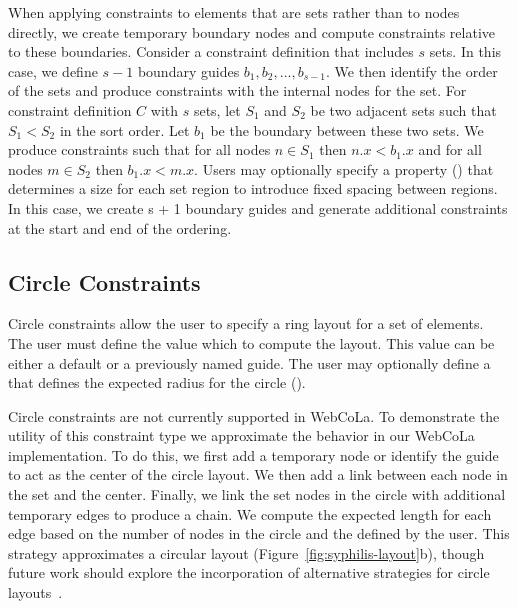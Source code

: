 When applying constraints to elements that are sets rather than to nodes
directly, we create temporary boundary nodes and compute constraints relative to
these boundaries. Consider a constraint definition that includes $s$ sets. 
In this case, we define $s-1$ boundary guides $b_1, b_2, ..., b_{s-1}$. We then
identify the order of the sets and produce constraints with the internal
nodes for the set. For constraint definition $C$ with $s$ sets, let $S_1$ and
$S_2$ be two adjacent sets such that $S_1 < S_2$ in the sort order. Let $b_1$ be
the boundary between these two sets. We produce constraints such that for all
nodes $n \in S_1$ then $n.x < b_1.x$ and for all nodes $m \in S_2$ then $b_1.x < m.x$.
Users may optionally specify a  property ()
that determines a size for each set region to introduce fixed spacing between regions.
In this case, we create s + 1 boundary guides and generate additional 
constraints at the start and end of the ordering.

\vspace{-5px}
\subsection{Circle Constraints}
Circle constraints allow the user to specify a ring layout for a set of
elements. The user must define the value  which to compute 
the layout. This value can be either a default  or a previously 
named guide. The user may optionally define a  that 
defines the expected radius for the circle ().

Circle constraints are not currently supported in WebCoLa. To
demonstrate the utility of this constraint type we approximate the behavior
in our WebCoLa implementation. To do this, we first add a temporary node
or identify the guide to act as the center of the circle layout.  We
then add a link between each
node in the set and the center. Finally, we link the set nodes in the circle
with additional temporary edges to produce a chain. We compute the expected
length for each edge based on the number of nodes in the circle and the 
 defined by the user. This strategy approximates a circular
layout (Figure~\ref{fig:syphilis-layout}b), though future work should
explore the incorporation of alternative strategies for circle layouts~\cite{dwyer2009layout}.

